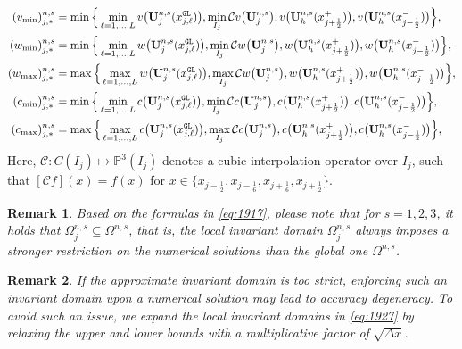 \documentclass[times,final]{elsarticle}
\newtheorem{remark}{Remark}[section]
\numberwithin{equation}{section}
\theoremstyle{definition}
\theoremstyle{remark}
\newcommand{\BU}{\mathbf{U}}
\begin{document}
\begin{equation}\label{eq:1982}
	\begin{aligned}
		(v_{\min})^{n,s}_{j,*}
		& =
		\min\Big\{
		\min\limits_{\ell = 1,\dots,L} v\big(\BU_{j}^{n,s}(x_{j,\ell}^{\tt GL})\big),
		\min\limits_{I_j} \mathcal{C} v\big(\BU_{j}^{n,s}\big),
		v\big(\BU_h^{n,s}(x_{j+\frac12}^{+})\big),
		v\big(\BU_h^{n,s}(x_{j-\frac12}^{-})\big)
		\Big\},
		\\
		(w_{\min})^{n,s}_{j,*}
		& =
		\min\Big\{
		\min\limits_{\ell = 1,\dots,L} w\big(\BU_{j}^{n,s}(x_{j,\ell}^{\tt GL})\big),
		\min\limits_{I_j} \mathcal{C} w\big(\BU_{j}^{n,s}\big),
		w\big(\BU_h^{n,s}(x_{j+\frac12}^{+})\big),
		w\big(\BU_h^{n,s}(x_{j-\frac12}^{-})\big)
		\Big\},
		\\
		(w_{\max})^{n,s}_{j,*}
		& =
		\max\Big\{
		\max\limits_{\ell = 1,\dots,L} w\big(\BU_{j}^{n,s}(x_{j,\ell}^{\tt GL})\big),
		\max\limits_{I_j} \mathcal{C} w\big(\BU_{j}^{n,s}\big),
		w\big(\BU_h^{n,s}(x_{j+\frac12}^{+})\big),
		w\big(\BU_h^{n,s}(x_{j-\frac12}^{-})\big)
		\Big\},
		\\
		(c_{\min})^{n,s}_{j,*}
		& =
		\min\Big\{
		\min\limits_{\ell = 1,\dots,L} c\big(\BU_{j}^{n,s}(x_{j,\ell}^{\tt GL})\big),
		\min\limits_{I_j} \mathcal{C} c\big(\BU_{j}^{n,s}\big),
		c\big(\BU_h^{n,s}(x_{j+\frac12}^{+})\big),
		c\big(\BU_h^{n,s}(x_{j-\frac12}^{-})\big)
		\Big\},
		\\
		(c_{\max})^{n,s}_{j,*}
		& =
		\max\Big\{
		\max\limits_{\ell = 1,\dots,L} c\big(\BU_{j}^{n,s}(x_{j,\ell}^{\tt GL})\big),
		\max\limits_{I_j} \mathcal{C} c\big(\BU_{j}^{n,s}\big),
		c\big(\BU_h^{n,s}(x_{j+\frac12}^{+})\big),
		c\big(\BU_h^{n,s}(x_{j-\frac12}^{-})\big)
		\Big\},
	\end{aligned}
\end{equation}
Here, $\mathcal{C}: C(I_j) \mapsto \mathbb{P}^3(I_j)$ denotes a cubic interpolation operator over $I_j$, such that $[\mathcal{C}f](x) = f(x)$ for $x \in \big\{x_{j-\frac12},x_{j-\frac16},x_{j+\frac16},x_{j+\frac12}\big\}$.
\begin{remark}
	Based on the formulas in \eqref{eq:1917}, please note that for $s = 1,2,3$, it holds that $\Omega^{n,s}_j \subseteq \Omega^{n,s}$, that is, the local invariant domain $\Omega^{n,s}_j$ always imposes a stronger restriction on the numerical solutions than the global one $\Omega^{n,s}$.
\end{remark}

\begin{remark}
	If the approximate invariant domain is too strict, enforcing such an invariant domain upon a numerical solution may lead to accuracy degeneracy. To avoid such an issue, we expand the local invariant domains in \eqref{eq:1927} by relaxing the upper and lower bounds with a multiplicative factor of $\sqrt{\Delta x}$.
\end{remark}
\end{document}
